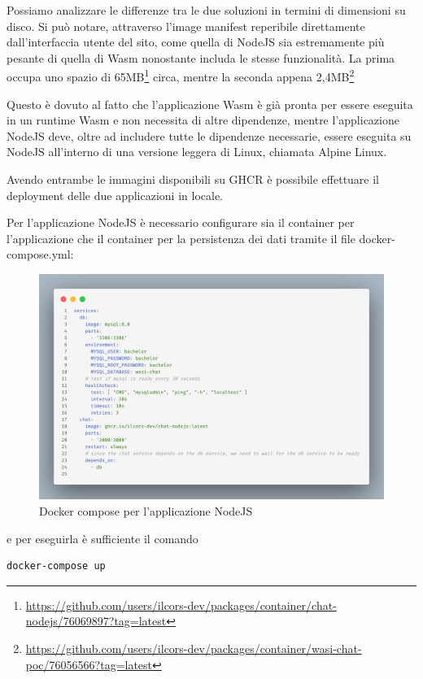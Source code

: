 Possiamo analizzare le differenze tra le due soluzioni in termini di dimensioni su disco. Si può notare, attraverso
l'image manifest reperibile direttamente dall'interfaccia utente del sito, come quella di NodeJS sia estremamente più
pesante di quella di Wasm nonostante includa le stesse funzionalità. La prima occupa uno spazio di
65MB\footnote{\url{https://github.com/users/ilcors-dev/packages/container/chat-nodejs/76069897?tag=latest}} circa,
mentre la seconda appena
2,4MB\footnote{\url{https://github.com/users/ilcors-dev/packages/container/wasi-chat-poc/76056566?tag=latest}}

Questo è dovuto al fatto che l'applicazione Wasm è già pronta per essere eseguita in un runtime Wasm e non necessita di
altre dipendenze, mentre l'applicazione NodeJS deve, oltre ad includere tutte le dipendenze necessarie, essere eseguita
su NodeJS all'interno di una versione leggera di Linux, chiamata Alpine Linux.

Avendo entrambe le immagini disponibili su GHCR è possibile effettuare il deployment delle due applicazioni in locale.

Per l'applicazione NodeJS è necessario configurare sia il container per l'applicazione che il container per la
persistenza dei dati tramite il file docker-compose.yml:

\begin{figure}[!htb]
    \includegraphics[width=\linewidth]{chapters/3.poc/images/5.docker-compose-nodejs.png}
    \caption{Docker compose per l'applicazione NodeJS}\label{fig:nodejs-dockercompose}
\end{figure}

e per eseguirla è sufficiente il comando

\begin{verbatim}
docker-compose up
\end{verbatim}

